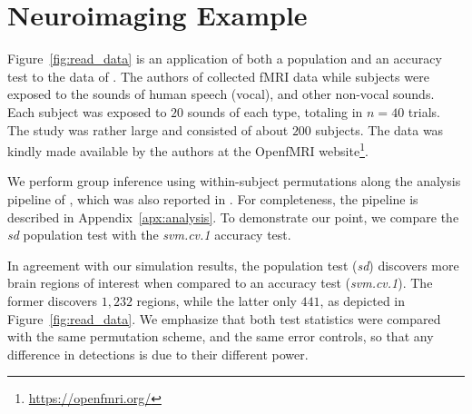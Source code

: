 \documentclass[12pt,a4paper]{article}
\theoremstyle{definition}
\begin{document}
\section{Neuroimaging Example}
\label{sec:example}

Figure~\ref{fig:read_data} is an application of both a population and an accuracy test to the data of \cite{pernet_human_2015}. 
The authors of \cite{pernet_human_2015} collected fMRI data while subjects were exposed to the sounds of human speech (vocal), and other non-vocal sounds. 
Each subject was exposed to $20$ sounds of each type, totaling in $n=40$ trials.
The study was rather large and consisted of about $200$ subjects.
The data was kindly made available by the authors at the OpenfMRI website\footnote{\url{https://openfmri.org/}}.

We perform group inference using within-subject permutations along the analysis pipeline of \cite{stelzer_statistical_2013}, which was also reported in \cite{gilron_quantifying_2016}. 
For completeness, the pipeline is described in Appendix~\ref{apx:analysis}. 
To demonstrate our point, we compare the \emph{sd} population test with the \emph{svm.cv.1} accuracy test. 

In agreement with our simulation results, the population test (\emph{sd}) discovers more brain regions of interest when compared to an accuracy test (\emph{svm.cv.1}).
The former discovers $1,232$ regions, while the latter only $441$, as depicted in Figure~\ref{fig:read_data}.
We emphasize that both test statistics were compared with the same permutation scheme, and the same error controls, so that any difference in detections is due to their different power.
\end{document}
